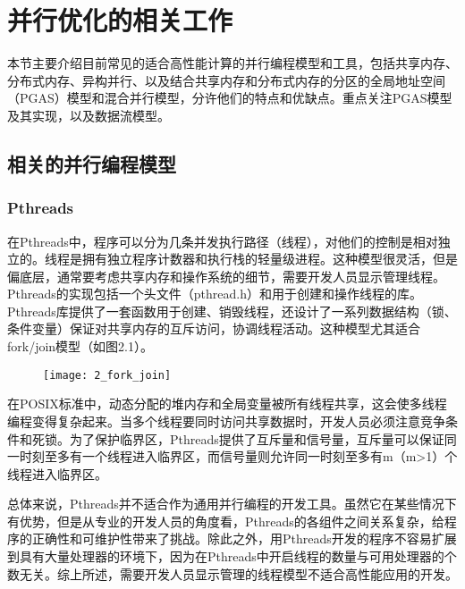 
\chapter{并行优化的相关工作}
\label{chap:related2}

本节主要介绍目前常见的适合高性能计算的并行编程模型和工具，包括共享内存、分布式内存、异构并行、以及结合共享内存和分布式内存的分区的全局地址空间（PGAS）模型和混合并行模型，分许他们的特点和优缺点。重点关注PGAS模型及其实现，以及数据流模型。

\section{相关的并行编程模型}

\subsection{Pthreads}

在Pthreads中，程序可以分为几条并发执行路径（线程），对他们的控制是相对独立的。线程是拥有独立程序计数器和执行栈的轻量级进程\citep{andrews2000foundations}。这种模型很灵活，但是偏底层，通常要考虑共享内存和操作系统的细节，需要开发人员显示管理线程。Pthreads的实现包括一个头文件（pthread.h）和用于创建和操作线程的库。Pthreads库提供了一套函数用于创建、销毁线程，还设计了一系列数据结构（锁、条件变量）保证对共享内存的互斥访问，协调线程活动。这种模型尤其适合fork/join模型\citep{mattson2004patterns}（如图2.1）。

\begin{figure}[!htbp]
    \centering
    \texttt{[image: 2\_fork\_join]}
    \label{fig:2_fork_join}
\end{figure}

在POSIX标准中，动态分配的堆内存和全局变量被所有线程共享，这会使多线程编程变得复杂起来。当多个线程要同时访问共享数据时，开发人员必须注意竞争条件和死锁。为了保护临界区，Pthreads提供了互斥量和信号量\citep{grama2003introduction}，互斥量可以保证同一时刻至多有一个线程进入临界区，而信号量则允许同一时刻至多有m（m>1）个线程进入临界区。

总体来说，Pthreads并不适合作为通用并行编程的开发工具。虽然它在某些情况下有优势，但是从专业的开发人员的角度看，Pthreads的各组件之间关系复杂，给程序的正确性和可维护性带来了挑战。除此之外，用Pthreads开发的程序不容易扩展到具有大量处理器的环境下\citep{dongarra2003sourcebook}，因为在Pthreads中开启线程的数量与可用处理器的个数无关。综上所述，需要开发人员显示管理的线程模型不适合高性能应用的开发。

